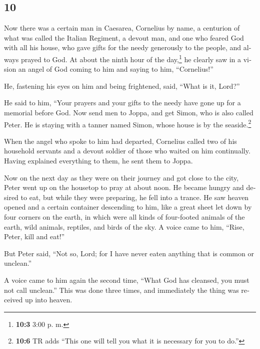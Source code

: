 \begin{paracol}{2}
\switchcolumn
\begin{otherlanguage}{english}

\hypertarget{section-19}{%
\section{10}\label{section-19}}

 Now there was a certain man in Caesarea, Cornelius by
name, a centurion of what was called the Italian Regiment,
 a devout man, and one who feared God with all his house,
who gave gifts for the needy generously to the people, and always prayed
to God.  At about the ninth hour of the day,\footnote{\textbf{10:3}
  3:00 p. m.} he clearly saw in a vision an angel of God coming to him
and saying to him, ``Cornelius!''

 He, fastening his eyes on him and being frightened, said,
``What is it, Lord?''

He said to him, ``Your prayers and your gifts to the needy have gone up
for a memorial before God.  Now send men to Joppa, and get
Simon, who is also called Peter.  He is staying with a
tanner named Simon, whose house is by the seaside.\footnote{\textbf{10:6}
  TR adds ``This one will tell you what it is necessary for you to do.''}

 When the angel who spoke to him had departed, Cornelius
called two of his household servants and a devout soldier of those who
waited on him continually.  Having explained everything to
them, he sent them to Joppa.

 Now on the next day as they were on their journey and got
close to the city, Peter went up on the housetop to pray at about noon.
 He became hungry and desired to eat, but while they were
preparing, he fell into a trance.  He saw heaven opened
and a certain container descending to him, like a great sheet let down
by four corners on the earth,  in which were all kinds of
four-footed animals of the earth, wild animals, reptiles, and birds of
the sky.  A voice came to him, ``Rise, Peter, kill and
eat!''

 But Peter said, ``Not so, Lord; for I have never eaten
anything that is common or unclean.''

 A voice came to him again the second time, ``What God
has cleansed, you must not call unclean.''  This was done
three times, and immediately the thing was received up into heaven.


\end{otherlanguage}
\end{paracol}
